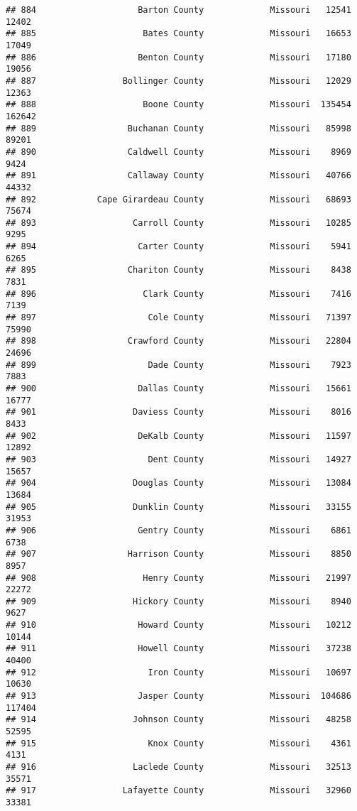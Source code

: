 \documentclass[
]{article}
\begin{document}
\begin{verbatim}
## 884                    Barton County             Missouri   12541   12402
## 885                     Bates County             Missouri   16653   17049
## 886                    Benton County             Missouri   17180   19056
## 887                 Bollinger County             Missouri   12029   12363
## 888                     Boone County             Missouri  135454  162642
## 889                  Buchanan County             Missouri   85998   89201
## 890                  Caldwell County             Missouri    8969    9424
## 891                  Callaway County             Missouri   40766   44332
## 892            Cape Girardeau County             Missouri   68693   75674
## 893                   Carroll County             Missouri   10285    9295
## 894                    Carter County             Missouri    5941    6265
## 895                  Chariton County             Missouri    8438    7831
## 896                     Clark County             Missouri    7416    7139
## 897                      Cole County             Missouri   71397   75990
## 898                  Crawford County             Missouri   22804   24696
## 899                      Dade County             Missouri    7923    7883
## 900                    Dallas County             Missouri   15661   16777
## 901                   Daviess County             Missouri    8016    8433
## 902                    DeKalb County             Missouri   11597   12892
## 903                      Dent County             Missouri   14927   15657
## 904                   Douglas County             Missouri   13084   13684
## 905                   Dunklin County             Missouri   33155   31953
## 906                    Gentry County             Missouri    6861    6738
## 907                  Harrison County             Missouri    8850    8957
## 908                     Henry County             Missouri   21997   22272
## 909                   Hickory County             Missouri    8940    9627
## 910                    Howard County             Missouri   10212   10144
## 911                    Howell County             Missouri   37238   40400
## 912                      Iron County             Missouri   10697   10630
## 913                    Jasper County             Missouri  104686  117404
## 914                   Johnson County             Missouri   48258   52595
## 915                      Knox County             Missouri    4361    4131
## 916                   Laclede County             Missouri   32513   35571
## 917                 Lafayette County             Missouri   32960   33381

\end{verbatim}
\end{document}
